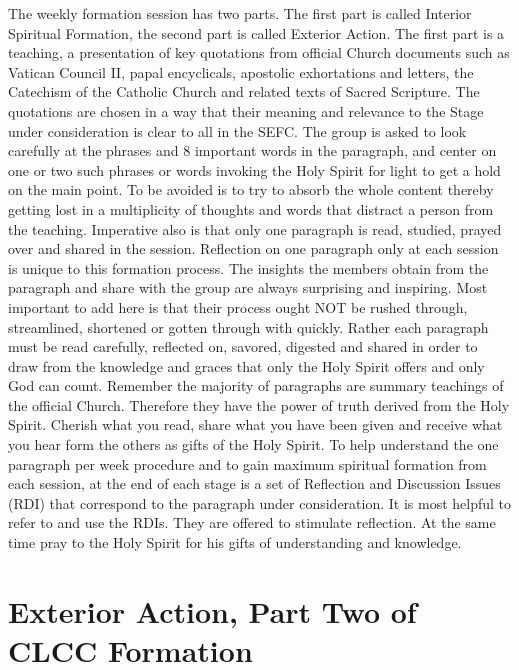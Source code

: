 \documentclass{article}        %
\begin{document}
The weekly formation session has two parts. The first part is called Interior
Spiritual Formation, the second part is called Exterior Action. The first part
is a teaching, a presentation of key quotations from official Church documents
such as Vatican Council II, papal encyclicals, apostolic exhortations and
letters, the Catechism of the Catholic Church and related texts of Sacred
Scripture. The quotations are chosen in a way that their meaning and relevance
to the Stage under consideration is clear to all in the SEFC. The group is asked
to look carefully at the phrases and
8
important words in the paragraph, and center on one or two such phrases or words
invoking the Holy Spirit for light to get a hold on the main point. To be
avoided is to try to absorb the whole content thereby getting lost in a
multiplicity of thoughts and words that distract a person from the
teaching. Imperative also is that only one paragraph is read, studied, prayed
over and shared in the session. Reflection on one paragraph only at each session
is unique to this formation process. The insights the members obtain from the
paragraph and share with the group are always surprising and inspiring. Most
important to add here is that their process ought NOT be rushed through,
streamlined, shortened or gotten through with quickly. Rather each paragraph
must be read carefully, reflected on, savored, digested and shared in order to
draw from the knowledge and graces that only the Holy Spirit offers and only God
can count. Remember the majority of paragraphs are summary teachings of the
official Church. Therefore they have the power of truth derived from the Holy
Spirit. Cherish what you read, share what you have been given and receive what
you hear form the others as gifts of the Holy Spirit.
To help understand the one paragraph per week procedure and to gain maximum
spiritual formation from each session, at the end of each stage is a set of
Reflection and Discussion Issues (RDI) that correspond to the paragraph under
consideration. It is most helpful to refer to and use the RDIs. They are offered
to stimulate reflection. At the same time pray to the Holy Spirit for his gifts
of understanding and knowledge.

\section{Exterior Action, Part Two of CLCC Formation}
\end{document}
